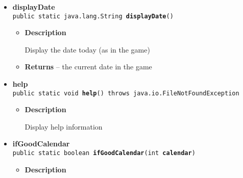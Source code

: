 {{{{{{\begin{itemize}
{\begin{itemize}
{Break lines in a long string to make display nicer\\ref: \url{http://stackoverflow.com/questions/7528045/large-string-split-into- lines-with-maximum-length-in-java}
}
\item{
{\bf  Parameters}
  \begin{itemize}
   \item{
\texttt{input} -- the string need to be broken}
   \item{
\texttt{maxLineLength} -- the maxium line length to insert break line}
  \end{itemize}
}%
\item{{\bf  Returns} -- 
the string with proper breaks 
}%
\end{itemize}
}%
\item{ 
{\bf  displayDate}\\
\texttt{public static java.lang.String\ {\bf  displayDate}()
\label{personOfInterest.Game.displayDate()}}%
\begin{itemize}
\item{
{\bf  Description}

Display the date today (as in the game)
}
\item{{\bf  Returns} -- 
the current date in the game 
}%
\end{itemize}
}%
\item{ 
{\bf  help}\\
\texttt{public static void\ {\bf  help}() throws java.io.FileNotFoundException
\label{personOfInterest.Game.help()}}%
\begin{itemize}
\item{
{\bf  Description}

Display help information
}
\end{itemize}
}%
\item{ 
{\bf  ifGoodCalendar}\\
\texttt{public static boolean\ {\bf  ifGoodCalendar}(\texttt{int\lbrack \rbrack } {\bf  calendar})
\label{personOfInterest.Game.ifGoodCalendar(int[])}}%
\begin{itemize}
\item{
{\bf  Description}

}
\end{itemize}}
\end{itemize}}}}}}}
